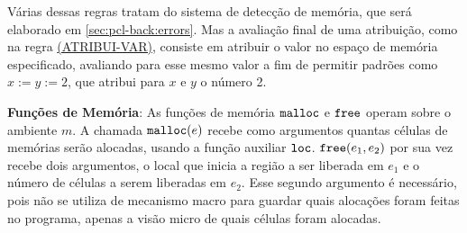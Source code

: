 


Várias dessas regras tratam do sistema de detecção de memória, que será elaborado em \ref{sec:pcl-back:errors}. Mas a avaliação final de uma atribuição, como na regra \hyperref[rule:atribui-var]{(ATRIBUI-VAR)}, consiste em atribuir o valor no espaço de memória especificado, avaliando para esse mesmo valor a fim de permitir padrões como $x := y := 2$, que atribui para $x$ e $y$ o número 2.

\label{sec:pcl-back:semantica:mem-func}

\textbf{Funções de Memória}: As funções de memória $\texttt{malloc}$ e $\texttt{free}$ operam sobre o ambiente $m$. A chamada $\texttt{malloc}(e)$ recebe como argumentos quantas células de memórias serão alocadas, usando a função auxiliar \hyperref[fig:def:loc]{$\texttt{loc}$}. $\texttt{free}(e_1, e_2)$ por sua vez recebe dois argumentos, o local que inicia a região a ser liberada em $e_1$ e o número de células a serem liberadas em $e_2$. Esse segundo argumento é necessário, pois não se utiliza de mecanismo macro para guardar quais alocações foram feitas no programa, apenas a visão micro de quais células foram alocadas.



